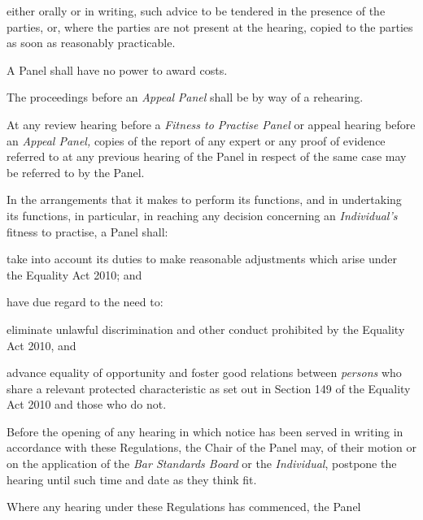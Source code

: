 either orally or in writing, such advice to be tendered in the presence
of the parties, or, where the parties are not present at the hearing,
copied to the parties as soon as reasonably practicable.\\
\par
A Panel shall have no power to award costs.\\
\par
The proceedings before an \emph{Appeal} \emph{Panel} shall be by way of
a rehearing.\\
\par
At any review hearing before a \emph{Fitness to Practise Panel} or
appeal hearing before an \emph{Appeal Panel,} copies of the report of
any expert or any proof of evidence referred to at any previous hearing
of the Panel in respect of the same case may be referred to by the
Panel.\\
\par
In the arrangements that it makes to perform its functions, and in
undertaking its functions, in particular, in reaching any decision
concerning an \emph{ Individual's} fitness to practise, a Panel shall:\\\nl \item take into account its duties to make reasonable adjustments which
arise under the Equality Act 2010; and\item have due regard to the need to:\al
\item  eliminate unlawful discrimination and other conduct prohibited by the
Equality Act 2010, and\\
\item  advance equality of opportunity and foster good relations
between \emph{persons} who share a relevant protected characteristic as
set out in Section 149 of the Equality Act 2010 and those who do not.\la\ln
{}\par
{}
Before the opening of any hearing in which notice has been served in
writing in accordance with these Regulations, the Chair of the Panel
may, of their motion or on the application of the \emph{Bar Standards
Board} or the \emph{Individual}, postpone the hearing until such time
and date as they think fit.\\
\par
Where any hearing under these Regulations has commenced, the Panel
